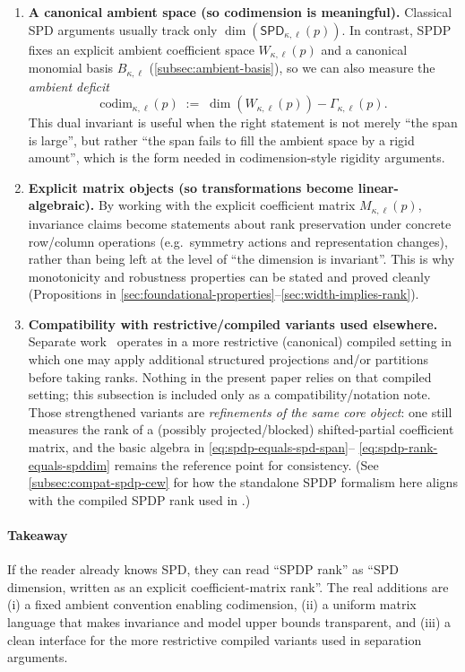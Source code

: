 \documentclass[12pt]{article}
\theoremstyle{definition}
\theoremstyle{remark}
\begin{document}
\begin{enumerate}
\item \textbf{A canonical ambient space (so codimension is meaningful).}
Classical SPD arguments usually track only $\dim(\mathsf{SPD}_{\kappa,\ell}(p))$.
In contrast, SPDP fixes an explicit ambient coefficient space $W_{\kappa,\ell}(p)$ and a
canonical monomial basis $B_{\kappa,\ell}$ (\ref{subsec:ambient-basis}), so we can
also measure the \emph{ambient deficit}
\[
\mathrm{codim}_{\kappa,\ell}(p)
\;:=\;
\dim(W_{\kappa,\ell}(p)) - \Gamma_{\kappa,\ell}(p).
\]
This dual invariant is useful when the right statement is not merely
``the span is large'', but rather ``the span fails to fill the ambient space by a
rigid amount'', which is the form needed in codimension-style rigidity arguments.

\item \textbf{Explicit matrix objects (so transformations become linear-algebraic).}
By working with the explicit coefficient matrix $M_{\kappa,\ell}(p)$, invariance claims
become statements about rank preservation under concrete row/column operations
(e.g.\ symmetry actions and representation changes), rather than being left at the
level of ``the dimension is invariant''.
This is why monotonicity and robustness properties can be stated and proved cleanly
(Propositions in \ref{sec:foundational-properties}--\ref{sec:width-implies-rank}).

\item \textbf{Compatibility with restrictive/compiled variants used elsewhere.}
Separate work~\citep{Edwards2025} operates in a more
restrictive (canonical) compiled setting in which one may apply additional
structured projections and/or partitions before taking ranks.
Nothing in the present paper relies on that compiled setting; this subsection is
included only as a compatibility/notation note.
Those strengthened variants are \emph{refinements of the same core object}:
one still measures the rank of a (possibly projected/blocked) shifted-partial
coefficient matrix, and the basic algebra in \eqref{eq:spdp-equals-spd-span}--%
\eqref{eq:spdp-rank-equals-spddim} remains the reference point for consistency.
(See \ref{subsec:compat-spdp-cew} for how the standalone SPDP formalism here
aligns with the compiled SPDP rank used in \citet{Edwards2025}.)
\end{enumerate}

\paragraph{Takeaway}
If the reader already knows SPD, they can read ``SPDP rank'' as
``SPD dimension, written as an explicit coefficient-matrix rank''.
The real additions are (i) a fixed ambient convention enabling codimension,
(ii) a uniform matrix language that makes invariance and model upper bounds
transparent, and (iii) a clean interface for the more restrictive compiled
variants used in separation arguments.
\end{document}
